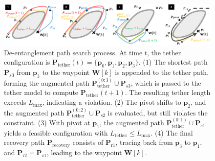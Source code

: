 \begin{figure}[h]
    \centering
    \includegraphics[width=\textwidth]{EA-Planner/figures/planner_newest1.pdf}
    \caption{De-entanglement path search process. At time \( t \), the tether configuration is \( \mathbf{P}_{\text{tether}}(t) = \{\mathbf{p}_0, \mathbf{p}_1, \mathbf{p}_2, \mathbf{p}_3\} \). 
    (1) The shortest path \( \mathbf{P}_{s3} \) from \( \mathbf{p}_3 \) to the waypoint \( \mathbf{W}[k] \) is appended to the tether path, forming the augmented path \( \mathbf{P}_{\text{tether}}^{(0:3)} \cup \mathbf{P}_{s3} \), which is passed to the tether model to compute \( \mathbf{P}_{\text{tether}}(t+1) \). The resulting tether length exceeds \( L_{\max} \), indicating a violation. 
    (2) The pivot shifts to \( \mathbf{p}_2 \), and the augmented path \( \mathbf{P}_{\text{tether}}^{(0:2)} \cup \mathbf{P}_{s2} \) is evaluated, but still violates the constraint. 
    (3) With pivot at \( \mathbf{p}_1 \), the augmented path \( \mathbf{P}_{\text{tether}}^{(0:1)} \cup \mathbf{P}_{s1} \) yields a feasible configuration with \( L_{\text{tether}} \leq L_{\max} \). 
    (4) The final recovery path \( \mathbf{P}_{\text{recovery}} \) consists of \( \mathbf{P}_{\text{r}1} \), tracing back from \( \mathbf{p}_3 \) to \( \mathbf{p}_1 \), and \( \mathbf{P}_{\text{r}2} = \mathbf{P}_{s1} \), leading to the waypoint \( \mathbf{W}[k] \).}
    \label{fig:planner_search}
\end{figure}










